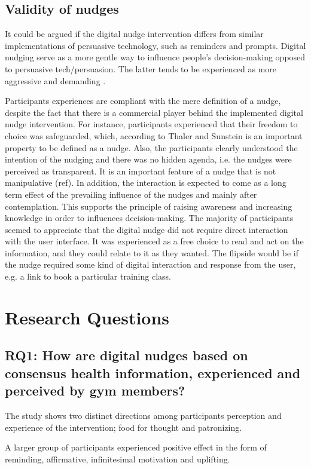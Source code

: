 \subsection{Validity of nudges}
It could be argued if the digital nudge intervention differs from similar implementations of persuasive technology, such as reminders and prompts. Digital nudging serve as a more gentle way to influence people's decision-making opposed to persuasive tech/persuasion. The latter tends to be experienced as more aggressive and demanding \cite{meske_status_2019}.

Participants experiences are compliant with the mere definition of a nudge, despite the fact that there is a commercial player behind the implemented digital nudge intervention. For instance, participants experienced that their freedom to choice was safeguarded, which, according to Thaler and Sunstein \cite{thaler_nudge-_2009} is an important property to be defined as a nudge. Also, the participants clearly understood the intention of the nudging and there was no hidden agenda, i.e. the nudges were perceived as transparent. It is an important feature of a nudge that is not manipulative (ref). In addition, the interaction is expected to come as a long term effect of the prevailing influence of the nudges and mainly after contemplation. This supports the principle of raising awareness and increasing knowledge in order to influences decision-making. The majority of participants seemed to appreciate that the digital nudge did not require direct interaction with the user interface. It was experienced as a free choice to read and act on the information, and they could relate to it as they wanted. The flipside would be if the nudge required some kind of digital interaction and response from the user, e.g. a link to book a particular training class.

\section{Research Questions}
\subsection{RQ1: How are digital nudges based on consensus health information, experienced and perceived by gym members?}

The study shows two distinct directions among participants perception and experience of the intervention; food for thought and patronizing. 

A larger group of participants experienced positive effect in the form of reminding, affirmative, infinitesimal motivation and uplifting. 

